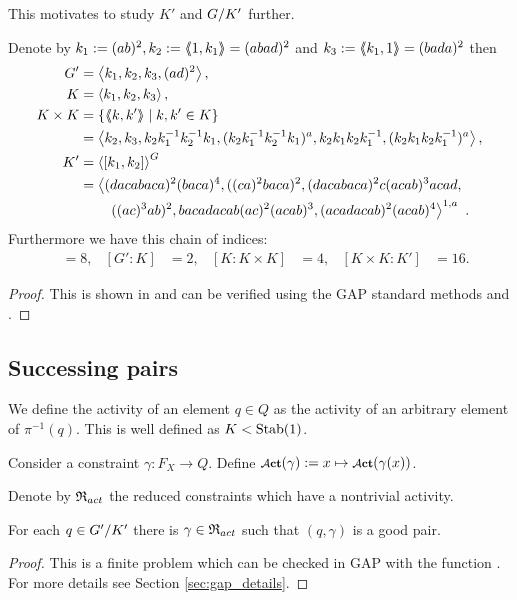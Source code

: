 \documentclass[a4paper,11pt]{amsart}
\begin{document}
This motivates to study $K'$ and ${G/K'}$ further.
\begin{lem} \label{lem:subgroupsOfG}
Denote by $k_1 := (ab)^2, k_2:=\langle\negthickspace\langle1,k_1\rangle\negthickspace\rangle = (abad)^2$ and $k_3:=\langle\negthickspace\langle k_1,1\rangle\negthickspace\rangle = (bada)^2$ then 
 \begin{align*}
  G' &= \left< k_1,k_2,k_3,(ad)^2\right>, \\
  K &= \left< k_1,k_2,k_3\right>, \\
  K\times K &= \{\langle\negthickspace\langle k,k'\rangle\negthickspace\rangle \mid k,k'\in K\} \\&= \left< k_2,k_3,k_2k_1^{-1}k_2^{-1}k_1,(k_2k_1^{-1}k_2^{-1}k_1)^a,k_2k_1k_2k_1^{-1},(k_2k_1k_2k_1^{-1})^a  \right>,\\
  K' &= \left< [k_1,k_2] \right>^G \\ 
  &= \left<(dacabaca)^2(baca)^4,((ca)^2baca)^2,(dacabaca)^2c(acab)^3acad,\right.\\
  &\qquad\left.((ac)^3ab)^2, bacadacab(ac)^2(acab)^3, (acadacab)^2(acab)^4\right>^{1,a}\ .
 \end{align*}
Furthermore we have this chain of indices:
\begin{align*}
  [G:G']&=8, & [G':K]&=2, &[K:K\times K]&= 4, &[K\times K:K']&=16. 
\end{align*}
\end{lem}
\begin{proof}
 This is shown in \cite{Bartholdi:BranchGroups} and can be verified using the GAP standard methods
  and . 
\end{proof}

\subsection{Successing pairs}
\begin{defi}
 We define the activity of an element $q\in Q$ as the activity of an arbitrary element of $\pi^{-1}(q)$. 
 This is well defined as $K<\textup{Stab}(1)$. 
 
 Consider a constraint $\gamma\colon F_X \to Q$. 
 Define $\act(\gamma):= x \mapsto \act(\gamma(x))$.
 
 Denote by $\mathfrak{R}_{act}$ the reduced constraints which have a nontrivial activity.
\end{defi}

\begin{lem} \label{lem:existsGoodGamma}
 For each $q\in{G'/K'}$ there is $\gamma\in \mathfrak{R}_{act}$ such that $(q,\gamma)$ is a 
 good pair.
\end{lem}
\begin{proof}
 This is a finite problem which can be checked in GAP with the function .
 For more details see Section \ref{sec:gap_details}.
\end{proof}
\end{document}
